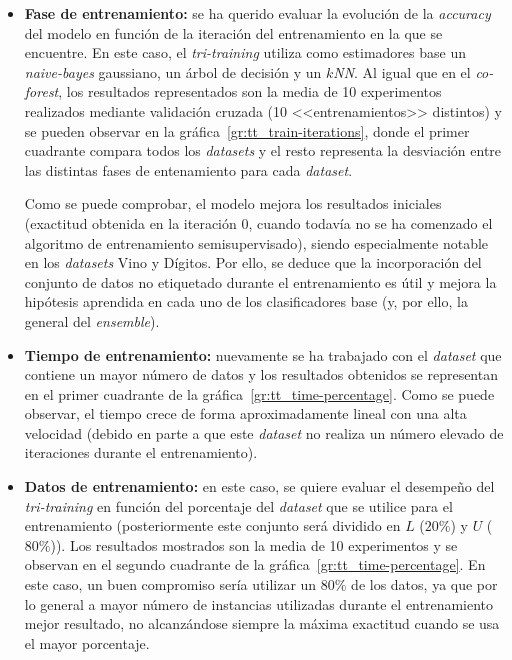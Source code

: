 \begin{itemize}
	\item \textbf{Fase de entrenamiento:} se ha querido evaluar la evolución de la \textit{accuracy} del modelo en función de la iteración del entrenamiento en la que se encuentre. En este caso, el \textit{tri-training} utiliza como estimadores base un \textit{naive-bayes} gaussiano, un árbol de decisión y un \textit{$k$NN}. Al igual que en el \textit{co-forest}, los resultados representados son la media de 10 experimentos realizados mediante validación cruzada (10 <<entrenamientos>> distintos) y se pueden observar en la gráfica~\ref{gr:tt_train-iterations}, donde el primer cuadrante compara todos los \textit{datasets} y el resto representa la desviación entre las distintas fases de entenamiento para cada \textit{dataset}.
	
	Como se puede comprobar, el modelo mejora los resultados iniciales (exactitud obtenida en la iteración $0$, cuando todavía no se ha comenzado el algoritmo de entrenamiento semisupervisado), siendo especialmente notable en los \textit{datasets} Vino y Dígitos. Por ello, se deduce que la incorporación del conjunto de datos no etiquetado durante el entrenamiento es útil y mejora la hipótesis aprendida en cada uno de los clasificadores base (y, por ello, la general del \textit{ensemble}).
	
	\item \textbf{Tiempo de entrenamiento:} nuevamente se ha trabajado con el \textit{dataset} que contiene un mayor número de datos y los resultados obtenidos se representan en el primer cuadrante de la gráfica~\ref{gr:tt_time-percentage}. Como se puede observar, el tiempo crece de forma aproximadamente lineal con una alta velocidad (debido en parte a que este \textit{dataset} no realiza un número elevado de iteraciones durante el entrenamiento).
	
	\item \textbf{Datos de entrenamiento:} en este caso, se quiere evaluar el desempeño del \textit{tri-training} en función del porcentaje del \textit{dataset} que se utilice para el entrenamiento (posteriormente este conjunto será dividido en $L$ ($20\%$) y $U$ ($80\%$)). Los resultados mostrados son la media de 10 experimentos y se observan en el segundo cuadrante de la gráfica~\ref{gr:tt_time-percentage}. En este caso, un buen compromiso sería utilizar un $80\%$ de los datos, ya que por lo general a mayor número de instancias utilizadas durante el entrenamiento mejor resultado, no alcanzándose siempre la máxima exactitud cuando se usa el mayor porcentaje.
\end{itemize} 

